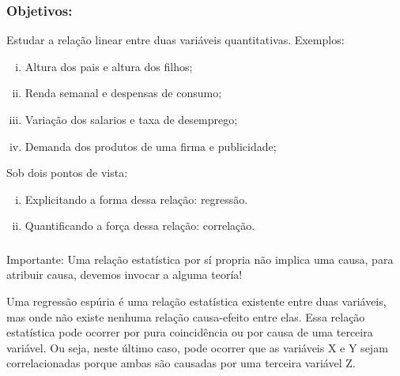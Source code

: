 \documentclass[14pt,aspectratio=1610]{beamer}
\begin{document}
\begin{frame}{}
\frametitle{Objetivos:}
\begin{block}{}
\justifying
Estudar a relação linear entre duas variáveis quantitativas. Exemplos:
\begin{enumerate}[(i)]
\item Altura dos pais e altura dos filhos;\pause
\item Renda semanal e despensas de consumo;\pause
\item Variação dos salarios e taxa de desemprego;\pause
\item Demanda dos produtos de uma firma e publicidade;\pause
\end{enumerate}
\end{block}
\begin{block}{}
\justifying
Sob dois pontos de vista:
\begin{enumerate}[(i)]
\item Explicitando a forma dessa relação: regressão.\pause
\item Quantificando a força dessa relação: correlação.
\end{enumerate}
\end{block}
\end{frame}

\begin{frame}{}
\frametitle{ }
\begin{block}{Importante:}
\justifying
Uma relação estatística por sí propria não implica uma causa, para atribuir causa, devemos invocar a alguma teoría!
\end{block}
\pause
\begin{block}{}
\justifying
Uma regressão espúria é uma relação estatística existente entre duas variáveis, mas onde não existe nenhuma relação causa-efeito entre elas. Essa relação estatística pode ocorrer por pura coincidência ou por causa de uma terceira variável. Ou seja, neste último caso, pode ocorrer que as variáveis X e Y sejam correlacionadas porque ambas são causadas por uma terceira variável Z.
\end{block}
\end{frame}
\end{document}
